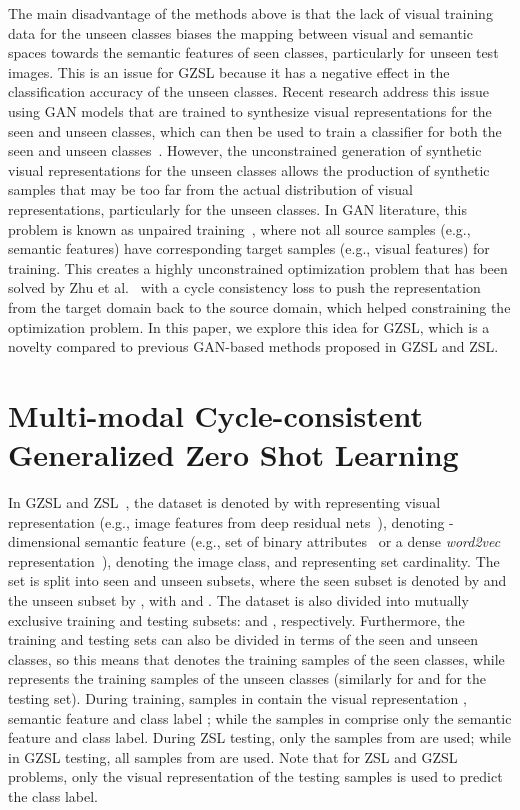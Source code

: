 \documentclass[runningheads]{llncs}
\begin{document}
The main disadvantage of the methods above is that the lack of visual training data for the unseen classes biases the mapping between visual and semantic spaces towards the semantic features of seen classes, particularly for unseen test images.  This is an issue for GZSL because it has a negative effect in the classification accuracy of the unseen classes.  Recent research address this issue using GAN models that are trained to synthesize visual representations for the seen and unseen classes, which can then be used to train a classifier for both the seen and unseen classes~\cite{long2017zero,bucher2017generating}. However, the unconstrained generation of synthetic visual representations for the unseen classes allows the production of synthetic samples that may be too far from the actual distribution of visual representations, particularly for the unseen classes.  
In GAN literature, this problem is known as unpaired training~\cite{CycleGAN2017}, where not all source samples (e.g., semantic features) have corresponding target samples (e.g., visual features) for training.  This creates a highly unconstrained optimization problem that has been solved by Zhu et al.~\cite{CycleGAN2017} with a cycle consistency loss to push the representation from the target domain back to the source domain, which helped constraining the optimization problem.  In this paper, we explore this idea for GZSL, which is a novelty compared to previous GAN-based methods proposed in GZSL and ZSL.  



\section{Multi-modal Cycle-consistent Generalized Zero Shot Learning}
\label{sec:method}

In GZSL and ZSL~\cite{XianCVPR2017}, the dataset is denoted by  with  representing visual representation (e.g., image features from deep residual nets~\cite{he2016resnet}),  denoting -dimensional semantic feature (e.g., set of binary attributes~\cite{lampert2014attribute} or a dense \textit{word2vec} representation~\cite{mikolov2013distributed}),  denoting the image class, and  representing set cardinality.
The set  is split into seen and unseen subsets, where the seen subset is denoted by  and the unseen subset by , with  and .  The dataset  is also divided into mutually exclusive training and testing subsets:  and , respectively.
Furthermore, the training and testing sets can also be divided in terms of the seen and unseen classes, so this means that  denotes the training samples of the seen classes, while  represents the training samples of the unseen classes (similarly for  and  for the testing set).
During training, samples in  contain the visual representation , semantic feature  and class label ; while the samples in  comprise only the semantic feature and class label.  During ZSL testing, only the samples from  are used; while in GZSL testing, all samples from  are used.  Note that for ZSL and GZSL problems, only the visual representation of the testing samples is used to predict the class label.
\end{document}
